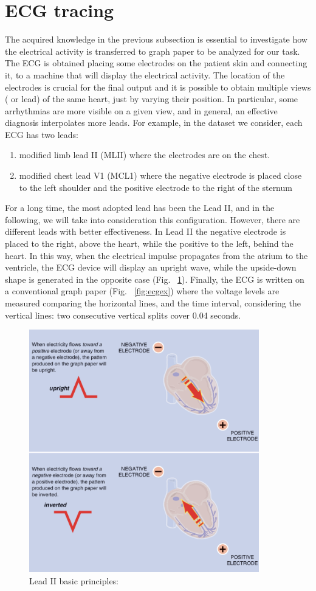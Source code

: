 \documentclass[LaM,binding=0.6cm]{sapthesis}
\begin{document}
\section{ECG tracing}
The acquired knowledge in the previous subsection is essential to investigate how the electrical activity is transferred to graph paper to be analyzed for our task. The ECG is obtained placing some electrodes on the patient skin and connecting it, to a machine that will display the electrical activity. The location of the electrodes is crucial for the final output and it is possible to obtain multiple views ( or lead) of the same heart, just by varying their position. In particular, some arrhythmias are more visible on a given view, and in general, an effective diagnosis interpolates more leads. For example, in the dataset we consider, each ECG has two leads:
\begin{enumerate}
\item modified limb lead II (MLII) where the electrodes are on the chest.
\item modified chest lead V1 (MCL1) where the negative electrode is placed close to the left shoulder and the positive electrode to the right of the sternum 
\end{enumerate}
For a long time, the most adopted lead has been the Lead II, and in the following, we will take into consideration this configuration. However, there are different leads with better effectiveness. In Lead II the negative electrode is placed to the right, above the heart, while the positive to the left, behind the heart. In this way, when the electrical impulse propagates from the atrium to the ventricle, the ECG device will display an upright wave, while the upside-down shape is generated in the opposite case (Fig. ~\ref{fig:ruleflow}). Finally, the ECG is written on a conventional graph paper (Fig. ~\ref{fig:ecgex}) where the voltage levels are measured comparing the horizontal lines, and the time interval, considering the vertical lines: two consecutive vertical splits cover 0.04 seconds.
\begin{figure}   \centering
    \includegraphics[width=100mm,scale=0.7]{ruleflow}
    \caption{Lead II basic principles: \cite{ecgbook}}
    \label{fig:ruleflow}
\end{figure}
\end{document}
